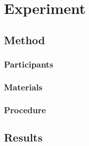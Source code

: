 \documentclass[10pt,letterpaper]{article}
\begin{document}
\section{Experiment}

\subsection{Method}

\subsubsection{Participants}

\subsubsection{Materials}

\subsubsection{Procedure}

\subsection{Results}



\setlength{\bibleftmargin}{.125in}
\setlength{\bibindent}{-\bibleftmargin}


\end{document}
